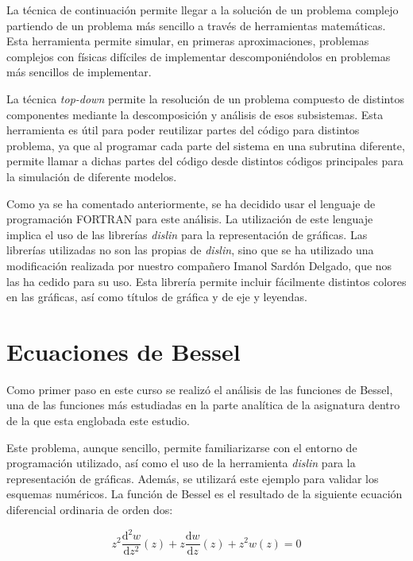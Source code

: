 \documentclass[11pt,singlespacing,liststotoc,headsepline,a4paper]{article}
\begin{document}
La técnica de continuación permite llegar a la solución de un problema complejo partiendo de un problema más sencillo a través de herramientas matemáticas. Esta herramienta permite simular, en primeras aproximaciones, problemas complejos con físicas difíciles de implementar descomponiéndolos en problemas más sencillos de implementar.

La técnica \textit{top-down} permite la resolución de un problema compuesto de distintos componentes mediante la descomposición y análisis de esos subsistemas. Esta herramienta es útil para poder reutilizar partes del código para distintos problema, ya que al programar cada parte del sistema en una subrutina diferente, permite llamar a dichas partes del código desde distintos códigos principales para la simulación de diferente modelos.

Como ya se ha comentado anteriormente, se ha decidido usar el lenguaje de programación FORTRAN para este análisis. La utilización de este lenguaje implica el uso de las librerías \textit{dislin} para la representación de gráficas. Las librerías utilizadas no son las propias de \textit{dislin}, sino que se ha utilizado una modificación realizada por nuestro compañero Imanol Sardón Delgado, que nos las ha cedido para su uso. Esta librería permite incluir fácilmente distintos colores en las gráficas, así como títulos de gráfica y de eje y leyendas.

	\newpage
	
\section{Ecuaciones de Bessel}
Como primer paso en este curso se realizó el análisis de las funciones de Bessel, una de las funciones más estudiadas en la parte analítica de la asignatura dentro de la que esta englobada este estudio.

Este problema, aunque sencillo, permite familiarizarse con el entorno de programación utilizado, así como el uso de la herramienta \textit{dislin} para la representación de gráficas. Además, se utilizará este ejemplo para validar los esquemas numéricos. La función de Bessel es el resultado de la siguiente ecuación diferencial ordinaria de orden dos:

\begin{equation}
z ^ { 2 } \frac { \mathrm { d } ^ { 2 } w } { \mathrm { d } z ^ { 2 } } ( z ) + z \frac { \mathrm { d } w } { \mathrm { d } z } ( z ) +  z ^ { 2 }  w ( z ) = 0
\end{equation}
\end{document}
